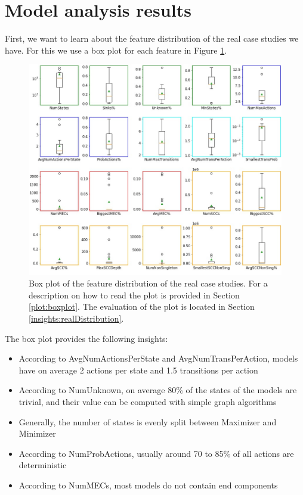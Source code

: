 \section{Model analysis results}
First, we want to learn about the feature distribution of the real case studies we have. 
For this we use a box plot for each feature in Figure \ref{fig:Real_FeatureDistribution}.
\begin{figure}[h!]
    \centering
    \includegraphics[width=1\textwidth]{figures/Real_FeatureDistribution.jpg}
    \caption[Feature Distribution of the case studies]{
        Box plot of the feature distribution of the real case studies. For a description on how to read the plot is provided in Section \ref{plot:boxplot}.
        The evaluation of the plot is located in Section \ref{insights:realDistribution}.
    }
    \label{fig:Real_FeatureDistribution}
\end{figure}
The box plot provides the following insights:
\begin{itemize} \label{insights:realDistribution}
    \item According to AvgNumActionsPerState and AvgNumTransPerAction, models have on average 2 actions per state and 1.5 transitions per action
    \item According to NumUnknown, on average 80\% of the states of the models are trivial, and their value can be computed with simple graph algorithms 
    \item Generally, the number of states is evenly split between Maximizer and Minimizer
    \item According to NumProbActions, usually around 70 to 85\% of all actions are deterministic
    \item According to NumMECs, most models do not contain end components
\end{itemize}


